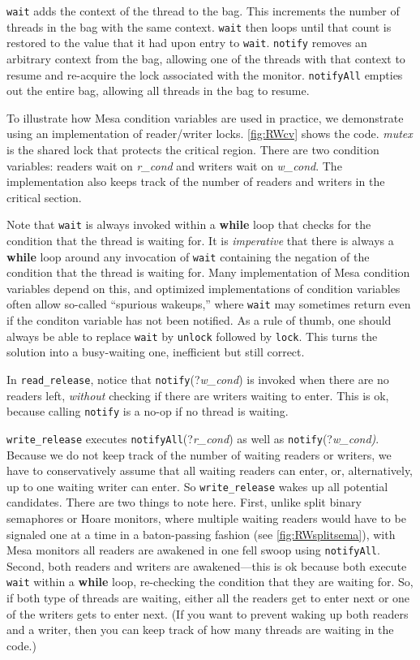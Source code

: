 \documentclass{report}
\begin{document}
{\texttt{wait} adds the context of the thread to the bag.
This increments the number of threads in the bag with the same context.
\texttt{wait} then loops until that count is restored to the
value that it had upon entry to \texttt{wait}.
\texttt{notify} removes an arbitrary context from
the bag, allowing one of the threads with that context to
resume and re-acquire the lock associated with the monitor.
\texttt{notifyAll} empties out the entire bag, allowing all threads
in the bag to resume.

To illustrate how Mesa condition variables are used in practice, we demonstrate using an implementation of reader/writer locks.
\autoref{fig:RWcv} shows the code.  \textit{mutex} is the shared lock
that protects the critical region.
There are two condition variables: readers wait on \textit{r\_cond} and
writers wait on \textit{w\_cond}.
The implementation also keeps track of the number of
readers and writers in the critical section.

Note that \texttt{wait} is always invoked within a \textbf{while}
loop that checks for the condition that the thread is waiting for.
It is \emph{imperative} that there is always a \textbf{while} loop
around any invocation of \texttt{wait} containing the negation of
the condition that the thread is waiting for.  Many implementation
of Mesa condition variables depend on this, and optimized implementations
of condition variables often allow so-called ``spurious wakeups,''
where \texttt{wait} may sometimes return even if the conditon
variable has not been notified.
As a rule of thumb, one should always be able to replace \texttt{wait}
by \texttt{unlock} followed by \texttt{lock}.
This turns the solution into a busy-waiting one, inefficient but still
correct.

In \texttt{read\_release}, notice that \texttt{notify}(?\textit{w\_cond})
is invoked when there are no readers left, \emph{without} checking
if there are writers waiting to enter.  This is
ok, because calling \texttt{notify} is a no-op if no thread is
waiting.

\texttt{write\_release} executes \texttt{notifyAll}(?\textit{r\_cond})
as well as \texttt{notify}(?\textit{w\_cond)}.  Because we
do not keep track of the number of waiting readers or writers, we
have to conservatively assume that all waiting readers can enter,
or, alternatively, up to one waiting writer can enter.  So
\texttt{write\_release} wakes up all potential candidates.  There
are two things to note here.  First, unlike split binary semaphores
or Hoare monitors, where multiple waiting readers would have to be
signaled one at a time in a baton-passing fashion (see
\autoref{fig:RWsplitsema}), with Mesa monitors all readers are
awakened in one fell swoop using \texttt{notifyAll}.  Second, both
readers and writers are awakened---this is ok because both execute
\texttt{wait} within a \textbf{while} loop, re-checking the condition
that they are waiting for.  So, if both type of threads are waiting,
either all the readers get to enter next or one of the writers gets
to enter next.  (If you want to prevent waking up both readers and
a writer, then you can keep track of how many threads are waiting
in the code.)

}
\end{document}
